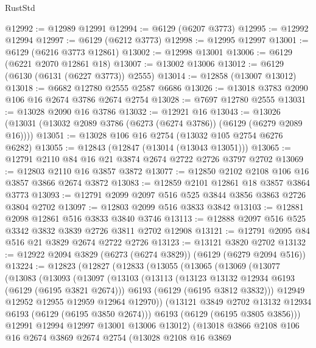 \begin{lexlean}{RustStd}
\begin{coremodule}
@12992 := @12989 @12991
@12994 := @6129 (@6207 @3773)
@12995 := @12992 @12994
@12997 := @6129 (@6212 @3773)
@12998 := @12995 @12997
@13001 := @6129 (@6216 @3773 @12861)
@13002 := @12998 @13001
@13006 := @6129 (@6221 @2070 @12861 @18)
@13007 := @13002 @13006
@13012 := @6129 (@6130 (@6131 (@6227 @3773)) @2555)
@13014 := @12858 (@13007 @13012)
@13018 := @6682 @12780 @2555 @2587 @6686
@13026 := @13018 @3783 @2090 @106 @16 @2674 @3786 @2674 @2754
@13028 := @7697 @12780 @2555
@13031 := @13028 @2090 @16 @3786
@13032 := @12921 @16
@13043 := @13026 (@13031 (@13032 @2089 @3786 (@6273 (@6274 @3786)) (@6129 (@6279 @2089 @16))))
@13051 := @13028 @106 @16 @2754 (@13032 @105 @2754 @6276 @6282)
@13055 := @12843 (@12847 (@13014 (@13043 @13051)))
@13065 := @12791 @2110 @84 @16 @21 @3874 @2674 @2722 @2726 @3797 @2702
@13069 := @12803 @2110 @16 @3857 @3872
@13077 := @12850 @2102 @2108 @106 @16 @3857 @3866 @2674 @3872
@13083 := @12859 @2101 @12861 @18 @3857 @3864 @3773
@13093 := @12791 @2099 @2097 @516 @525 @3844 @3856 @3863 @2726 @3804 @2702
@13097 := @12803 @2099 @516 @3833 @3842
@13103 := @12881 @2098 @12861 @516 @3833 @3840 @3746
@13113 := @12888 @2097 @516 @525 @3342 @3832 @3839 @2726 @3811 @2702 @12908
@13121 := @12791 @2095 @84 @516 @21 @3829 @2674 @2722 @2726
@13123 := @13121 @3820 @2702
@13132 := @12922 @2094 @3829 (@6273 (@6274 @3829)) (@6129 (@6279 @2094 @516))
@13224 := @12823
    (@12827
      (@12833
        (@13055
          (@13065
            (@13069
              (@13077
                (@13083
                  (@13093
                    (@13097
                      (@13103
                        (@13113
                          (@13123 @13132 @12934 @6193 (@6129 (@6195 @3821 @2674)))
                          @6193
                          (@6129 (@6195 @3812 @3832)))
                        @12949
                        @12952
                        @12955
                        @12959
                        @12964
                        @12970))
                    (@13121 @3849 @2702 @13132 @12934 @6193 (@6129 (@6195 @3850 @2674)))
                    @6193
                    (@6129 (@6195 @3805 @3856)))
                  @12991
                  @12994
                  @12997
                  @13001
                  @13006
                  @13012)
                (@13018
                  @3866
                  @2108
                  @106
                  @16
                  @2674
                  @3869
                  @2674
                  @2754
                  (@13028
                    @2108
                    @16
                    @3869

\end{coremodule}
\end{lexlean}
